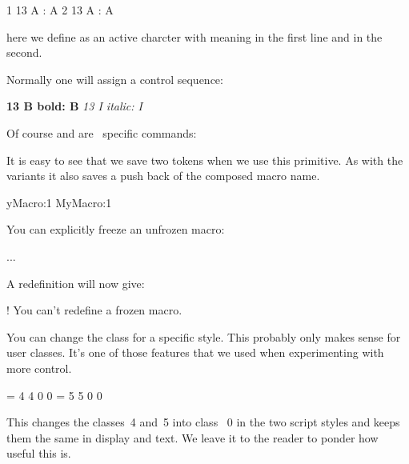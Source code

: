 \startbuffer
{ 1  13 A : \meaning A}\crlf
{ 2  13 A : \meaning A}\par
\stopbuffer

\typebuffer

here we define  as an active charcter with meaning  in the
first line and  in the second.

{\tttf \getbuffer}

Normally one will assign a control sequence:

\startbuffer
{ \bf {} 13 {B   bold}: \meaning B}\crlf
{ \it {} 13 {I italic}: \meaning I}\par
\stopbuffer

\typebuffer

Of course \type {\bf} and \type {\it} are \CONTEXT\ specific commands:

{\tttf \getbuffer}

\stopnewprimitive

\startnewprimitive[title={\prm {letcsname}}]

It is easy to see that we save two tokens when we use this primitive. As with the
 variants it also saves a push back of the composed macro name.

\starttyping
\expandafter\let\csname MyMacro:1\endcsname\relax
              MyMacro:1\endcsname\relax
\stoptyping

\stopnewprimitive

\startnewprimitive[title={\prm {letfrozen}}]

You can explicitly freeze an unfrozen macro:

\starttyping
\def\MyMacro{...}
\MyMacro
\stoptyping

A redefinition will now give:

\starttyping
! You can't redefine a frozen macro.
\stoptyping

\stopnewprimitive

\startnewprimitive[title={\prm {letmathatomrule}}]

You can change the class for a specific style. This probably only makes sense
for user classes. It's one of those features that we used when experimenting
with more control.

\starttyping
{} = 4 4 0 0
 = 5 5 0 0
\stoptyping

This changes the classes~4 and~5 into class~ 0 in the two script styles and keeps
them the same in display and text. We leave it to the reader to ponder how useful
this is.


